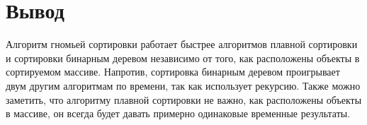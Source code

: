\section*{Вывод}

Алгоритм гномьей сортировки работает быстрее алгоритмов плавной сортировки и сортировки бинарным деревом независимо от того, как расположены объекты в сортируемом массиве. Напротив, сортировка бинарным деревом проигрывает двум другим алгоритмам по времени, так как использует рекурсию. Также можно заметить, что алгоритму плавной сортировки не важно, как расположены объекты в массиве, он всегда будет давать примерно одинаковые временные результаты.
